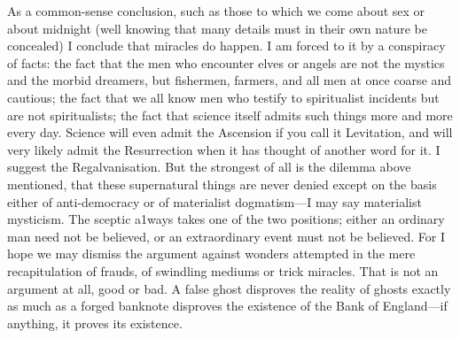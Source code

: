 \documentclass{book}
\begin{document}
As a common-sense conclusion, such as those to which we come about sex or about midnight (well knowing that many details must in their own nature be concealed) I conclude that miracles do happen. I am forced to it by a conspiracy of facts: the fact that the men who encounter elves or angels are not the mystics and the morbid dreamers, but fishermen, farmers, and all men at once coarse and cautious; the fact that we all know men who testify to spiritualist incidents but are not spiritualists; the fact that science itself admits such things more and more every day. Science will even admit the Ascension if you call it Levitation, and will very likely admit the Resurrection when it has thought of another word for it. I suggest the Regalvanisation. But the strongest of all is the dilemma above mentioned, that these supernatural things are never denied except on the basis either of anti-democracy or of materialist dogmatism—I may say materialist mysticism. The sceptic a1ways takes one of the two positions; either an ordinary man need not be believed, or an extraordinary event must not be believed. For I hope we may dismiss the argument against wonders attempted in the mere recapitulation of frauds, of swindling mediums or trick miracles. That is not an argument at all, good or bad. A false ghost disproves the reality of ghosts exactly as much as a forged banknote disproves the existence of the Bank of England—if anything, it proves its existence.
\end{document}
